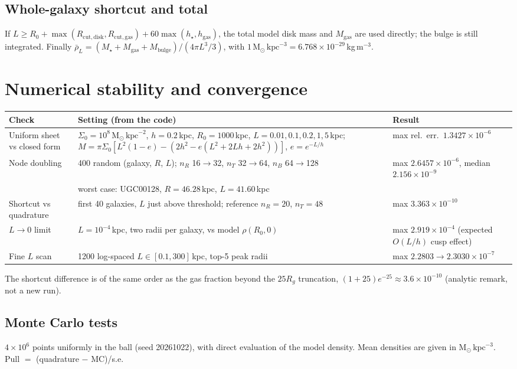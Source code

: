 \documentclass[10pt,a4paper]{article}
\newcommand{\Msun}{\mathrm{M}_\odot}
\begin{document}
\subsection{Whole-galaxy shortcut and total}
If $L\ge R_0+\max(R_\mathrm{cut,disk},R_\mathrm{cut,gas})+60\max(h_\star,h_\mathrm{gas})$, the total model disk mass and $M_\mathrm{gas}$ are used directly; the bulge is still integrated. Finally $\bar\rho_L=(M_\star+M_\mathrm{gas}+M_\mathrm{bulge})/(4\pi L^3/3)$, with $1\,\Msun\,\mathrm{kpc}^{-3}=6.768\times10^{-29}$\,kg\,m$^{-3}$.

\section{Numerical stability and convergence}
\begin{tabularx}{\textwidth}{@{}lL>{\raggedright\arraybackslash}p{4.2cm}@{}}
\toprule
Check & Setting (from the code) & Result\\
\midrule
Uniform sheet vs closed form & $\Sigma_0=10^8\,\Msun\,\mathrm{kpc}^{-2}$, $h=0.2$\,kpc, $R_0=1000$\,kpc, $L=0.01,0.1,0.2,1,5$\,kpc; $M=\pi\Sigma_0[L^2(1-e)-(2h^2-e(L^2+2Lh+2h^2))]$, $e=e^{-L/h}$ & max rel.\ err.\ $1.3427\times10^{-6}$\\
Node doubling & 400 random (galaxy, $R$, $L$); $n_R$ 16$\to$32, $n_T$ 32$\to$64, $n_B$ 64$\to$128 & max $2.6457\times10^{-6}$, median $2.156\times10^{-9}$\\
 & worst case: UGC00128, $R=46.28$\,kpc, $L=41.60$\,kpc & \\
Shortcut vs quadrature & first 40 galaxies, $L$ just above threshold; reference $n_R=20$, $n_T=48$ & max $3.363\times10^{-10}$\\
$L\to0$ limit & $L=10^{-4}$\,kpc, two radii per galaxy, vs model $\rho(R_0,0)$ & max $2.919\times10^{-4}$ (expected $O(L/h)$ cusp effect)\\
Fine $L$ scan & 1200 log-spaced $L\in[0.1,300]$\,kpc, top-5 peak radii & max $2.2803\to2.3030\times10^{-7}$\\
\bottomrule
\end{tabularx}

\noindent The shortcut difference is of the same order as the gas fraction beyond the $25R_g$ truncation, $(1+25)e^{-25}\approx3.6\times10^{-10}$ (analytic remark, not a new run).

\subsection{Monte Carlo tests}
$4\times10^6$ points uniformly in the ball (seed 20261022), with direct evaluation of the model density. Mean densities are given in $\Msun\,\mathrm{kpc}^{-3}$. Pull $=$ (quadrature $-$ MC)/s.e.
\end{document}
